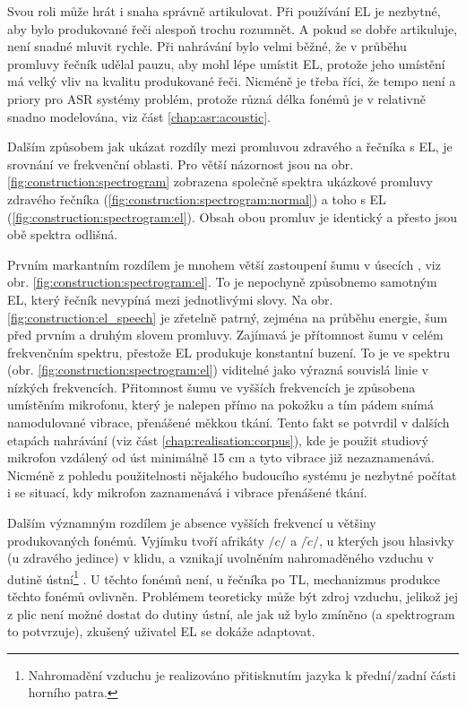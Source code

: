 Svou roli může hrát i snaha správně artikulovat. Při používání EL je nezbytné, aby bylo produkované řeči alespoň trochu rozumnět. A pokud se dobře artikuluje, není snadné mluvit rychle. Při nahrávání bylo velmi běžné, že v průběhu promluvy řečník udělal pauzu, aby mohl lépe umístit EL, protože jeho umístění má velký vliv na kvalitu produkované řeči. Nicméně je třeba říci, že tempo není a priory pro ASR systémy problém, protože různá délka fonémů je v relativně snadno modelována, viz část \ref{chap:asr:acoustic}.

Dalším způsobem jak ukázat rozdíly mezi promluvou zdravého a řečníka s EL, je srovnání ve frekvenční oblasti. Pro větší názornost jsou na obr. \ref{fig:construction:spectrogram} zobrazena společně spektra ukázkové promluvy zdravého řečníka (\ref{fig:construction:spectrogram:normal}) a toho s EL (\ref{fig:construction:spectrogram:el}). Obsah obou promluv je identický a přesto jsou obě spektra odlišná.

Prvním markantním rozdílem je mnohem větší zastoupení šumu v úsecích , viz obr. \ref{fig:construction:spectrogram:el}. To je nepochyně způsobnemo samotným EL, který řečník nevypíná mezi jednotlivými slovy. Na obr. \ref{fig:construction:el_speech} je zřetelně patrný, zejména na průběhu energie, šum před prvním a druhým slovem promluvy. Zajímavá je přítomnost šumu v celém frekvenčním spektru, přestože EL produkuje konstantní buzení. To je ve spektru (obr. \ref{fig:construction:spectrogram:el}) viditelné jako výrazná souvislá linie v nízkých frekvencích. Přitomnost šumu ve vyšších frekvencích je způsobena umístěním mikrofonu, který je nalepen přímo na pokožku a tím pádem snímá namodulované vibrace, přenášené měkkou tkání. Tento fakt se potvrdil v dalších etapách nahrávání (viz část \ref{chap:realisation:corpus}), kde je použit studiový mikrofon vzdálený od úst minimálně 15 cm a tyto vibrace již nezaznamenává. Nicméně z pohledu použitelnosti nějakého budoucího systému je nezbytné počítat i se situací, kdy mikrofon zaznamenává i vibrace přenášené tkání.

Dalším významným rozdílem je absence vyšších frekvencí u většiny produkovaných fonémů. Vyjímku tvoří afrikáty $/c/$ a $/\check{c}/$, u kterých jsou hlasivky (u zdravého jedince) v klidu, a vznikají uvolněním nahromaděného vzduchu v dutině ústní\footnote{Nahromadění vzduchu je realizováno přitisknutím jazyka k přední/zadní části horního patra.} \cite{Psutka2006}. U těchto fonémů není, u  řečníka po TL, mechanizmus produkce těchto fonémů ovlivněn. Problémem teoreticky může být zdroj vzduchu, jelikož jej z plic není možné dostat do dutiny ústní, ale jak už bylo zmíněno (a spektrogram to potvrzuje), zkušený uživatel EL se dokáže adaptovat.

